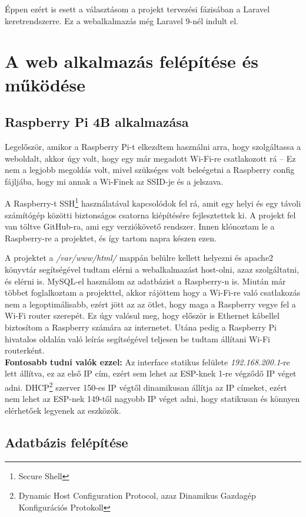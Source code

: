 \documentclass[
]{thesis-ekf}
\theoremstyle{definition}
\theoremstyle{remark}
\begin{document}
	Éppen ezért is esett a választásom a projekt tervezési fázisában a Laravel keretrendszerre. Ez a webalkalmazás még Laravel 9-nél indult el.
	
	\chapter{A web alkalmazás felépítése és működése}
	\section{Raspberry Pi 4B alkalmazása}
	
	Legelőször, amikor a Raspberry Pi-t elkezdtem használni arra, hogy szolgáltassa a weboldalt, akkor úgy volt, hogy egy már megadott Wi-Fi-re csatlakozott rá -- Ez nem a legjobb megoldás volt, mivel szükséges volt beleégetni a Raspberry config fájljába, hogy mi annak a Wi-Finek az SSID-je és a jelszava.
	
	A Raspberry-t SSH\footnote{Secure Shell} használatával kapcsolódok fel rá, amit egy helyi és egy távoli számítógép közötti biztonságos csatorna kiépítésére fejlesztettek ki.
	A projekt fel van töltve GitHub-ra\cite{github-repo}, ami egy verziókövető rendszer. Innen klónoztam le a Raspberry-re a projektet, és így tartom napra készen ezen.
	
	A projektet a \emph{/var/www/html/} mappán belülre kellett helyezni és apache2 könyvtár segítségével tudtam elérni a webalkalmazást host-olni, azaz szolgáltatni, és elérni is.
	MySQL-el használom az adatbázist a Raspberry-n is.
	Miután már többet foglalkoztam a projekttel, akkor rájöttem hogy a Wi-Fi-re való csatlakozás nem a legoptimálisabb, ezért jött az az ötlet, hogy maga a Raspberry vegye fel a Wi-Fi router szerepét. Ez úgy valósul meg, hogy először is Ethernet kábellel biztosítom a Raspberry számára az internetet. Utána pedig a Raspberry Pi hivatalos oldalán való leírás\cite{raspberry-as-wifi} segítségével teljesen be tudtam állítani Wi-Fi routerként.\\
	\textbf{Fontosabb tudni valók ezzel:}
	Az interface statikus felülete \emph{192.168.200.1}-re lett állítva, ez az első IP cím, ezért sem lehet az ESP-knek 1-re végződő IP véget adni. DHCP\footnote{Dynamic Host Configuration Protocol, azaz Dinamikus Gazdagép Konfigurációs Protokoll} szerver 150-es IP végtől dinamikusan állítja az IP címeket, ezért nem lehet az ESP-nek 149-től nagyobb IP véget adni, hogy statikusan és könnyen elérhetőek legyenek az eszközök.
	
	\section{Adatbázis felépítése}\label{database}
	
\end{document}
